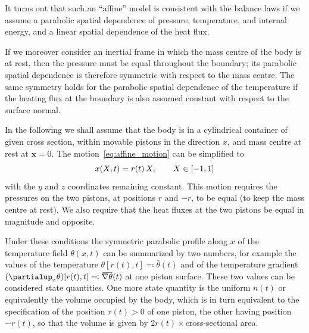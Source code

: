 \documentclass[\ifafour a4paper,12pt,\else a5paper,10pt,\fi%
onecolumn,oneside,article,%
british%
]{memoir}
\theoremstyle{remark}
\theoremstyle{innote}
\newcommand*{\de}{\partialup}%
\newcommand*{\defs}{\eqqcolon}
\DeclarePairedDelimiter\clcl{[}{]}
\renewcommand*{\|}[1][]{\nonscript\,#1\vert\nonscript\;\mathopen{}}
\newcommand*{\widebar}[1]{{\mkern1.5mu\skew{2}\overline{\mkern-1.5mu#1\mkern-1.5mu}\mkern 1.5mu}}
\newcommand*{\yr}{r}
\newcommand*{\yt}{\theta}
\newcommand*{\yx}{\bm{x}}
\newcommand*{\ytb}{\bar{\yt}}
\newcommand*{\ygb}{\widebar{\nabla\yt}}
\begin{document}
It turns out that such an \enquote{affine} model is consistent with the
balance laws if we assume a parabolic spatial dependence of pressure,
temperature, and internal energy, and a linear spatial dependence of the
heat flux.

If we moreover consider an inertial frame in which the mass centre of the
body is at rest, then the pressure must be equal throughout the boundary;
its parabolic spatial dependence is therefore symmetric with respect to the
mass centre. The same symmetry holds for the parabolic spatial dependence
of the temperature if the heating flux at the boundary is also assumed
constant with respect to the surface normal.

In the following we shall assume that the body is in a cylindrical
container of given cross section, within movable pistons in the direction
$x$, and mass centre at rest at $\yx = 0$. The
motion~\eqref{eq:affine_motion} can be simplified to
\begin{equation}
  \label{eq:simplified_affine_motion}
  x(X,t) = \yr(t) \, X, \qquad X \in \clcl{-1, 1}
\end{equation}
with the $y$ and $z$ coordinates remaining constant. This motion requires
the pressures on the two pistons, at positions $\yr$ and $-\yr$, to be
equal (to keep the mass centre at rest). We also require that the heat
fluxes at the two pistons be equal in magnitude and opposite.

Under these conditions the symmetric parabolic profile along $x$ of the
temperature field $\yt(x, t)$ can be summarized by two numbers, for example
the values of the temperature $\yt[\yr(t), t] \defs \ytb(t)$ and of the
temperature gradient $(\de_{x}\yt)[\yr(t), t] \defs \ygb(t)$ at one piston
surface. These two values can be considered state quantities. One more
state quantity is the uniform $n(t)$ or equivalently the volume occupied by
the body, which is in turn equivalent to the specification of the position
$\yr(t) > 0$ of one piston, the other having position $-\yr(t)$, so that
the volume is given by $2 \yr(t) \times{}$cross-sectional area.
\end{document}
